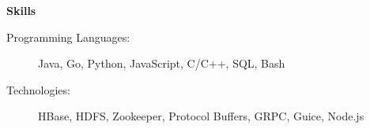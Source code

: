 \documentclass[letterpaper,11pt]{article}
\newcommand{\resheading}[1]{{\large \colorbox{mygrey}{\begin{minipage}{\textwidth}{\textbf{#1 \vphantom{p\^{E}}}}\end{minipage}}}}
\begin{document}
\resheading{Skills}
	\begin{description}
		\item[Programming Languages:] { \footnotesize
			Java, Go, Python, JavaScript, C/C++, SQL, Bash
		}
		\item[Technologies:] { \footnotesize
			HBase, HDFS, Zookeeper, Protocol Buffers, GRPC, Guice, Node.js
		}
	\end{description} %

\end{document}

